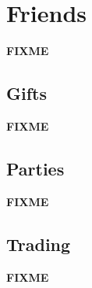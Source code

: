 \chapter{Friends}
\label{chap:friends}
\textbf{FIXME}

\section{Gifts}
\label{sec:gifts}
\textbf{FIXME}

\section{Parties}
\label{sec:parties}
\textbf{FIXME}

\section{Trading}
\label{sec:trades}
\textbf{FIXME}
